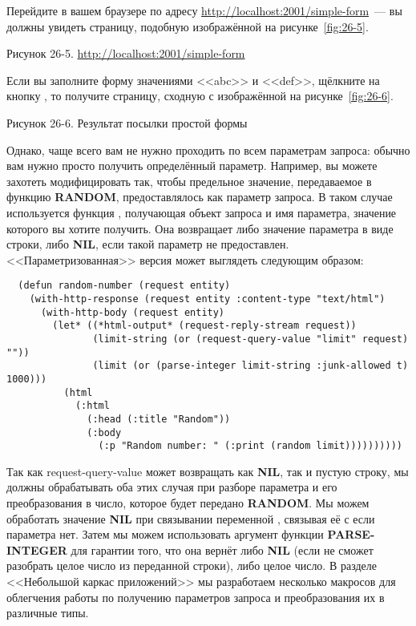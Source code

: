 Перейдите в вашем браузере по адресу \url{http://localhost:2001/simple-form}~--- вы должны
увидеть страницу, подобную изображённой на рисунке~\ref{fig:26-5}.

Рисунок 26-5. \url{http://localhost:2001/simple-form}

Если вы заполните форму значениями <<abc>> и <<def>>, щёлкните на кнопку , то
получите страницу, сходную с изображённой на рисунке~\ref{fig:26-6}.

Рисунок 26-6. Результат посылки простой формы

Однако, чаще всего вам не нужно проходить по всем параметрам запроса: обычно вам нужно
просто получить определённый параметр. Например, вы можете захотеть модифицировать
 так, чтобы предельное значение, передаваемое в функцию
\textbf{RANDOM}, предоставлялось как параметр запроса. В таком случае используется функция
, получающая объект запроса и имя параметра, значение которого
вы хотите получить. Она возвращает либо значение параметра в виде строки, либо
\textbf{NIL}, если такой параметр не предоставлен. <<Параметризованная>> версия
 может выглядеть следующим образом:

\begin{lstlisting}
  (defun random-number (request entity)
    (with-http-response (request entity :content-type "text/html")
      (with-http-body (request entity)
        (let* ((*html-output* (request-reply-stream request))
               (limit-string (or (request-query-value "limit" request) ""))
               (limit (or (parse-integer limit-string :junk-allowed t) 1000)))
          (html
            (:html
              (:head (:title "Random"))
              (:body
                (:p "Random number: " (:print (random limit))))))))))
\end{lstlisting}

Так как request-query-value может возвращать как \textbf{NIL}, так и пустую строку, мы
должны обрабатывать оба этих случая при разборе параметра и его преобразования в число,
которое будет передано \textbf{RANDOM}. Мы можем обработать значение \textbf{NIL} при
связывании переменной , связывая её с  если параметра
нет. Затем мы можем использовать аргумент функции \textbf{PARSE-INTEGER}
 для гарантии того, что она вернёт либо \textbf{NIL} (если не сможет
разобрать целое число из переданной строки), либо целое число. В разделе <<Небольшой каркас
приложений>> мы разработаем несколько макросов для облегчения работы по получению
параметров запроса и преобразования их в различные типы.

